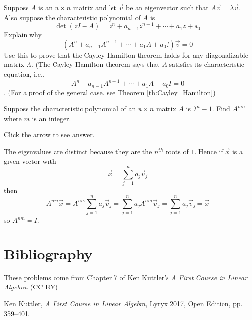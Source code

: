 \documentclass{ximera}
\begin{document}
\begin{problem}\label{prb:8.26} Suppose $A$ is an $n\times n$ matrix and let $\vec{v}$ be an
eigenvector such that $A\vec{v}=\lambda \vec{v}$. Also suppose the
characteristic polynomial of $A$ is
\begin{equation*}
\det \left( z I-A\right) =z ^{n}+a_{n-1} z ^{n-1}+\cdots
+a_{1}z +a_{0}
\end{equation*}
Explain why
\begin{equation*}
\left( A^{n}+a_{n-1}A^{n-1}+\cdots +a_{1}A+a_{0}I\right) \vec{v}=0
\end{equation*}
Use this to prove that the Cayley-Hamilton
theorem holds for any diagonalizable matrix $A$. (The Cayley-Hamilton theorem says that $A$ satisfies its
characteristic equation, i.e.,
\begin{equation*}
A^{n}+a_{n-1}A^{n-1}+\cdots +a_{1}A+a_{0}I=0
\end{equation*}.  (For a proof of the general case, see Theorem \ref{th:Cayley_Hamilton})
\end{problem}

\begin{problem}\label{prb:8.27} Suppose the characteristic polynomial of an $n\times n$ matrix $A$ is
$\lambda^{n}-1$. Find $A^{mn}$ where $m$ is an integer.

Click the arrow to see answer.
\begin{expandable}
The eigenvalues are distinct because
they are the $n^{th}$ roots of $1$. Hence if $\vec{x}$ is a given vector with
\[
\vec{x}=\sum_{j=1}^{n}a_{j}\vec{v}_{j}
\]
then
\[
A^{nm}\vec{x}=A^{nm}\sum_{j=1}^{n}a_{j}\vec{v}_{j}=
\sum_{j=1}^{n}a_{j}A^{nm}\vec{v}_{j}=\sum_{j=1}^{n}a_{j}\vec{v}_{j}=\vec{x}
\]
so $A^{nm}=I$.
\end{expandable}
\end{problem}



\section*{Bibliography}

These problems come from Chapter 7 of Ken Kuttler's \href{https://open.umn.edu/opentextbooks/textbooks/a-first-course-in-linear-algebra-2017}{\it A First Course in Linear Algebra}. (CC-BY)

Ken Kuttler, {\it  A First Course in Linear Algebra}, Lyryx 2017, Open Edition, pp. 359--401.
\end{document}
